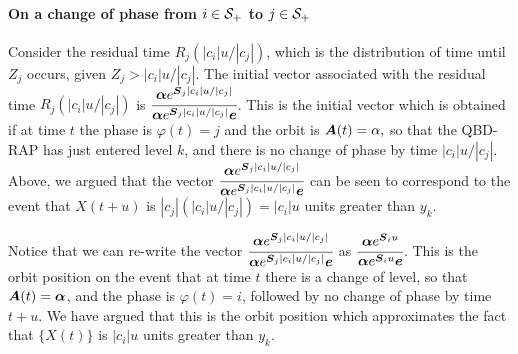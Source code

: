 \paragraph{On a change of phase from \(i\in\mathcal{S}_+\) to \(j\in\mathcal{S}_+\)} 
Consider the residual time \(R_j(|c_i|u/|c_j|)\), which is the distribution of time until \(Z_j\) occurs, given \(Z_j>|c_i|u/|c_j|\). The initial vector associated with the residual time \(R_j(|c_i|u/|c_j|)\) is \(\cfrac{\boldsymbol \alpha e^{\boldsymbol S_j |c_i|u/|c_j| } }{\boldsymbol \alpha e^{\boldsymbol S_j |c_i|u/|c_j|} \boldsymbol e }\). This is the initial vector which is obtained if at time \(t\) the phase is \(\varphi(t)=j\) and the orbit is \(\boldsymbol A(t)=\alpha,\) so that the QBD-RAP has just entered level \(k\), and there is no change of phase by time \(|c_i|u/|c_j|\). Above, we argued that the vector \(\cfrac{\boldsymbol \alpha e^{\boldsymbol S_j |c_i|u/|c_j| } }{\boldsymbol \alpha e^{\boldsymbol S_j |c_i|u/|c_j|} \boldsymbol e }\) can be seen to correspond to the event that \(X(t+u)\) is \(|c_j|\left(|c_i|u/|c_j|\right) = |c_i|u\) units greater than \(y_k\). 

Notice that we can re-write the vector 
\(\cfrac{\boldsymbol \alpha e^{\boldsymbol S_j |c_i|u/|c_j| } }{\boldsymbol \alpha e^{\boldsymbol S_j |c_i|u/|c_j|} \boldsymbol e }\) as \(\cfrac{\boldsymbol \alpha e^{\boldsymbol S_iu } }{\boldsymbol \alpha e^{\boldsymbol S_iu} \boldsymbol e }\). This is the orbit position on the event that at time \(t\) there is a change of level, so that \(\boldsymbol A(t)=\boldsymbol \alpha\), and the phase is \(\varphi(t)=i\), followed by no change of phase by time \(t+u\). We have argued that this is the orbit position which approximates the fact that \(\{X(t)\}\) is \(|c_i|u\) units greater than \(y_k\). 

